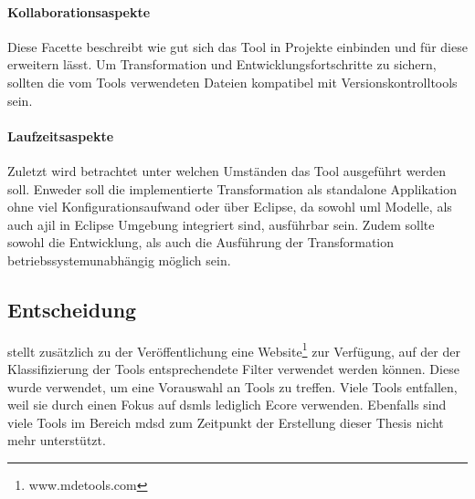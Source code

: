 \documentclass[
	oneside,  %
	ngerman, 
	final, 
	11pt, 
	a4paper, 
	1.1headlines, 
	headinclude=false, 
	footinclude=false, 
	mpinclude=false, 
	pagesize, 
	onecolumn, 
	titlepage, 
	parskip=half, 
	headsepline, 
	chapterprefix=false, 
	version=first, 
	listof=totoc, 
	bibliography=totoc, 
	toc=graduated, 
	fleqn
]{scrbook}
\begin{document}
\paragraph{Kollaborationsaspekte}
Diese Facette beschreibt wie gut sich das Tool in Projekte einbinden und für diese erweitern lässt. 
Um Transformation und Entwicklungsfortschritte zu sichern, sollten die vom Tools verwendeten Dateien kompatibel mit Versionskontrolltools sein.
\paragraph{Laufzeitsaspekte}
Zuletzt wird betrachtet unter welchen Umständen das Tool ausgeführt werden soll.
Enweder soll die implementierte Transformation als standalone Applikation ohne viel Konfigurationsaufwand oder über Eclipse, da sowohl \ac{uml} Modelle, als auch \ac{ajil} in Eclipse Umgebung integriert sind, ausführbar sein. Zudem sollte sowohl die Entwicklung, als auch die Ausführung der Transformation betriebssystemunabhängig möglich sein. 


\subsection{Entscheidung}
\cite{MDEToolEvaluation} stellt zusätzlich zu der Veröffentlichung eine Website\footnote{www.mdetools.com} zur Verfügung, auf der der Klassifizierung der Tools entsprechendete Filter verwendet werden können. Diese wurde verwendet, um eine Vorauswahl an Tools zu treffen. Viele Tools entfallen, weil sie durch einen Fokus auf \ac{dsml}s lediglich Ecore verwenden. Ebenfalls sind viele Tools im Bereich \ac{mdsd} zum Zeitpunkt der Erstellung dieser Thesis nicht mehr unterstützt.
\end{document}
